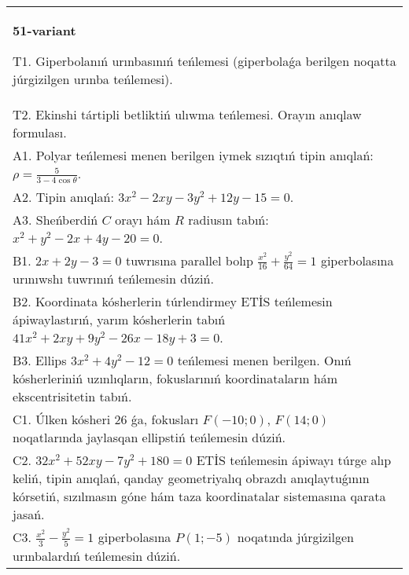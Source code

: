 \documentclass{article}
\begin{document}
\begin{tabular}{m{17cm}}
\textbf{51-variant}
\newline

T1. Giperbolanıń urınbasınıń teńlemesi (giperbolaǵa berilgen noqatta júrgizilgen urınba teńlemesi).\\

T2. Ekinshi tártipli betliktiń ulıwma teńlemesi. Orayın anıqlaw formulası.\\

A1. Polyar teńlemesi menen berilgen iymek sızıqtıń tipin anıqlań: $\rho=\frac{5}{3-4\cos\theta}$.\\

A2. Tipin anıqlań: $3 x^{2}-2 xy-3 y^{2}+12 y-15=0$.\\

A3. Sheńberdiń $C$ orayı hám $R$ radiusın tabıń: $x^2+y^2-2 x+4 y-20=0$.\\

B1. $2x + 2y - 3 = 0$ tuwrısına parallel bolıp $\frac{x^{2}}{16} + \frac{y^{2}}{64} = 1$ giperbolasına urınıwshı tuwrınıń teńlemesin dúziń.  \\

B2. Koordinata kósherlerin túrlendirmey ETİS teńlemesin ápiwaylastırıń, yarım kósherlerin tabıń $41x^{2} + 2xy + 9y^{2} - 26x - 18y + 3 = 0$.  \\

B3. Ellips $3x^{2} + 4y^{2} - 12 = 0$ teńlemesi menen berilgen. Onıń kósherleriniń uzınlıqların, fokuslarınıń koordinataların hám ekscentrisitetin tabıń.  \\

C1. Úlken kósheri 26 ǵa, fokusları $F( - 10;0)$, $F(14;0)$ noqatlarında jaylasqan ellipstiń teńlemesin dúziń.  \\

C2. $32x^{2} + 52xy - 7y^{2} + 180 = 0$ ETİS teńlemesin ápiwayı túrge alıp keliń, tipin anıqlań, qanday geometriyalıq obrazdı anıqlaytuǵının kórsetiń, sızılmasın góne hám taza koordinatalar sistemasına qarata jasań.  \\

C3. $\frac{x^{2}}{3} - \frac{y^{2}}{5} = 1$ giperbolasına $P(1; - 5)$ noqatında júrgizilgen urınbalardıń teńlemesin dúziń.\\

\end{tabular}
\vspace{1cm}
\end{document}

